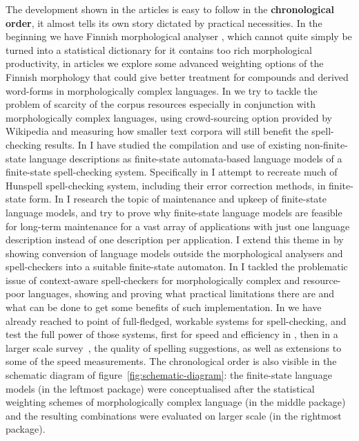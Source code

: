 \documentclass[officiallayout]{unihelcompling}
\begin{document}
The development shown in the articles is easy to follow in the
\textbf{chronological order}, it almost tells its own story dictated by
practical necessities. In the beginning we have Finnish morphological analyser
\citep{pirinen2008suomen}, which cannot quite simply be turned into a
statistical dictionary for it contains too rich morphological productivity, in
articles  we explore some
advanced weighting options of the Finnish morphology that could give better
treatment for compounds and derived word-forms in morphologically complex
languages. In  we try to tackle the problem
of scarcity of the corpus resources especially in conjunction with
morphologically complex languages, using crowd-sourcing option provided by
Wikipedia and measuring how smaller text corpora will still benefit the
spell-checking results. In 
I have studied the compilation and use of existing non-finite-state language
descriptions as finite-state automata-based language models of a finite-state
spell-checking system.  Specifically in  I
attempt to recreate much of Hunspell spell-checking system, including their
error correction methods, in finite-state form. In
 I research the topic of maintenance and
upkeep of finite-state language models, and try to prove why finite-state
language models are feasible for long-term maintenance for a vast array of
applications with just one language description instead of one description per
application.  I extend this theme in  by
showing conversion of language models outside the morphological analysers and
spell-checkers into a suitable finite-state automaton. In
 I tackled the problematic issue of
context-aware spell-checkers for morphologically complex and resource-poor
languages, showing and proving what practical limitations there are and what
can be done to get some benefits of such implementation. In
 we have already reached to
point of full-fledged, workable systems for spell-checking, and test the full
power of those systems, first for speed and efficiency in
, then in a larger scale
survey~, the quality of spelling suggestions, as
well as extensions to some of the speed measurements.
The chronological order is also visible in the schematic diagram of
figure~\ref{fig:schematic-diagram}: the finite-state language models (in the
leftmost package) were conceptualised after the statistical weighting schemes
of morphologically complex language (in the middle package) and the resulting
combinations were evaluated on larger scale (in the rightmost package).
\end{document}
